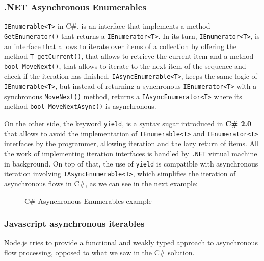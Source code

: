\subsubsection{.NET Asynchronous Enumerables}
\label{csenums}
	\texttt{IEnumerable<T>} in C\#, is an interface that implements a method \texttt{GetEnumerator()} that returns a \texttt{IEnumerator<T>}. 
	In its turn, \texttt{IEnumerator<T>}, is an interface that allows to iterate over items of a collection by offering the method \texttt{T getCurrent()}, that allows to retrieve the current item 
	and a method \texttt{bool MoveNext()}, that allows to iterate to the next item of the sequence and check if the iteration has finished.
	\texttt{IAsyncEnumerable<T>}, keeps the same logic of \texttt{IEnumerable<T>}, but instead of returning a synchronous \texttt{IEnumerator<T>} with a synchronous \texttt{MoveNext()} method, returns a \texttt{IAsyncEnumerator<T>} where its method \texttt{bool MoveNextAsync()} is asynchronous. 
	
	On the other side, the keyword \texttt{yield}, is a syntax sugar introduced in \textbf{C\# 2.0} that allows to avoid the implementation of \texttt{IEnumerable<T>} and \texttt{IEnumerator<T>} interfaces by the programmer,
	allowing iteration and the lazy return of items. All the work of implementing iteration interfaces is handled by \texttt{.NET} virtual machine in background. 
	On top of that, the use of \texttt{yield} is compatible with asynchronous iteration involving \texttt{IAsyncEnumerable<T>}, which simplifies the iteration of asynchronous flows in C\#, as we can see in the next example:
	

	\begin{figure}[H]
		\centering
		\caption{C\# Asynchronous Enumerables example}
		\label{fig:enumex}
	\end{figure}

\subsubsection{Javascript asynchronous iterables}
\label{jsae}
	Node.js tries to provide a functional and weakly typed approach to asynchronous flow processing, opposed to what we saw in the C\# solution.

